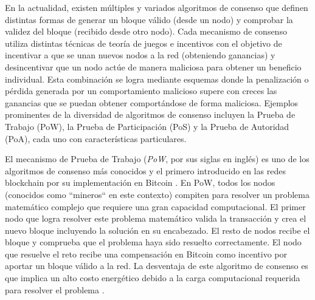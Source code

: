 En la actualidad, existen múltiples y variados algoritmos de consenso que definen distintas formas de generar un bloque válido (desde un nodo) y comprobar la validez del bloque (recibido desde otro nodo). Cada mecanismo de consenso utiliza distintas técnicas de teoría de juegos e incentivos con el objetivo de incentivar a que se unan nuevos nodos a la red (obteniendo ganancias) y desincentivar que un nodo actúe de manera maliciosa para obtener un beneficio individual. Esta combinación se logra mediante esquemas donde la penalización o pérdida generada por un comportamiento malicioso supere con creces las ganancias que se puedan obtener comportándose de forma maliciosa. Ejemplos prominentes de la diversidad de algoritmos de consenso incluyen la Prueba de Trabajo (PoW), la Prueba de Participación (PoS) y la Prueba de Autoridad (PoA), cada uno con características particulares.

El mecanismo de Prueba de Trabajo (\textit{PoW}, por sus siglas en inglés) es uno de los algoritmos de consenso más conocidos y el primero introducido en las redes blockchain por su implementación en Bitcoin \cite{satoshi2008bitcoin}. En PoW, todos los nodos (conocidos como ``mineros`` en este contexto) compiten para resolver un problema matemático complejo que requiere una gran capacidad computacional. El primer nodo que logra resolver este problema matemático valida la transacción y crea el nuevo bloque incluyendo la solución en su encabezado. El resto de nodos recibe el bloque y comprueba que el problema haya sido resuelto correctamente. El nodo que resuelve el reto recibe una compensación en Bitcoin como incentivo por aportar un bloque válido a la red. La desventaja de este algoritmo de consenso es que implica un alto costo energético debido a la carga computacional requerida para resolver el problema \cite{pending}.

